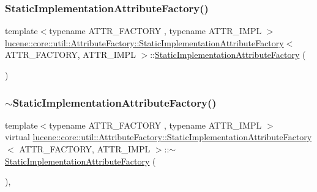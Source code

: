 \subsubsection{\texorpdfstring{Static\+Implementation\+Attribute\+Factory()}{StaticImplementationAttributeFactory()}}
{\footnotesize\ttfamily template$<$typename A\+T\+T\+R\+\_\+\+F\+A\+C\+T\+O\+RY , typename A\+T\+T\+R\+\_\+\+I\+M\+PL $>$ \\
\mbox{\hyperlink{classlucene_1_1core_1_1util_1_1AttributeFactory_1_1StaticImplementationAttributeFactory}{lucene\+::core\+::util\+::\+Attribute\+Factory\+::\+Static\+Implementation\+Attribute\+Factory}}$<$ A\+T\+T\+R\+\_\+\+F\+A\+C\+T\+O\+RY, A\+T\+T\+R\+\_\+\+I\+M\+PL $>$\+::\mbox{\hyperlink{classlucene_1_1core_1_1util_1_1AttributeFactory_1_1StaticImplementationAttributeFactory}{Static\+Implementation\+Attribute\+Factory}} (\begin{DoxyParamCaption}{ }\end{DoxyParamCaption})\hspace{0.3cm}{\ttfamily [inline]}}

\mbox{\label{classlucene_1_1core_1_1util_1_1AttributeFactory_1_1StaticImplementationAttributeFactory_a5f8394a6ae54e7aed546e0b8f40ce400}} 
\subsubsection{\texorpdfstring{$\sim$\+Static\+Implementation\+Attribute\+Factory()}{~StaticImplementationAttributeFactory()}}
{\footnotesize\ttfamily template$<$typename A\+T\+T\+R\+\_\+\+F\+A\+C\+T\+O\+RY , typename A\+T\+T\+R\+\_\+\+I\+M\+PL $>$ \\
virtual \mbox{\hyperlink{classlucene_1_1core_1_1util_1_1AttributeFactory_1_1StaticImplementationAttributeFactory}{lucene\+::core\+::util\+::\+Attribute\+Factory\+::\+Static\+Implementation\+Attribute\+Factory}}$<$ A\+T\+T\+R\+\_\+\+F\+A\+C\+T\+O\+RY, A\+T\+T\+R\+\_\+\+I\+M\+PL $>$\+::$\sim$\mbox{\hyperlink{classlucene_1_1core_1_1util_1_1AttributeFactory_1_1StaticImplementationAttributeFactory}{Static\+Implementation\+Attribute\+Factory}} (\begin{DoxyParamCaption}{ }\end{DoxyParamCaption})\hspace{0.3cm}{\ttfamily [inline]}, {\ttfamily [virtual]}}



